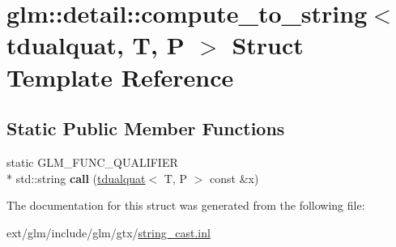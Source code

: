 \hypertarget{structglm_1_1detail_1_1compute__to__string_3_01tdualquat_00_01_t_00_01_p_01_4}{\section{glm\-:\-:detail\-:\-:compute\-\_\-to\-\_\-string$<$ tdualquat, T, P $>$ Struct Template Reference}
\label{structglm_1_1detail_1_1compute__to__string_3_01tdualquat_00_01_t_00_01_p_01_4}
}
\subsection*{Static Public Member Functions}
\begin{DoxyCompactItemize}
\item 
\hypertarget{structglm_1_1detail_1_1compute__to__string_3_01tdualquat_00_01_t_00_01_p_01_4_a1768ea4c6a68bcecf9571363b69c1497}{static G\-L\-M\-\_\-\-F\-U\-N\-C\-\_\-\-Q\-U\-A\-L\-I\-F\-I\-E\-R \\*
std\-::string {\bfseries call} (\hyperlink{structglm_1_1tdualquat}{tdualquat}$<$ T, P $>$ const \&x)}\label{structglm_1_1detail_1_1compute__to__string_3_01tdualquat_00_01_t_00_01_p_01_4_a1768ea4c6a68bcecf9571363b69c1497}

\end{DoxyCompactItemize}


The documentation for this struct was generated from the following file\-:\begin{DoxyCompactItemize}
\item 
ext/glm/include/glm/gtx/\hyperlink{string__cast_8inl}{string\-\_\-cast.\-inl}\end{DoxyCompactItemize}
